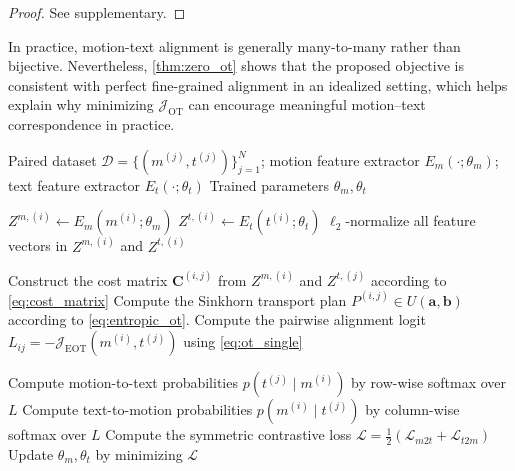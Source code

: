 \begin{proof} See supplementary.
\end{proof}

In practice, motion-text alignment is generally many-to-many rather than bijective. Nevertheless, \cref{thm:zero_ot} shows that the proposed objective is consistent with perfect fine-grained alignment in an idealized setting, which helps explain why minimizing $\mathcal{J}_{\mathrm{OT}}$ can encourage meaningful motion--text correspondence in practice.

\begin{algorithm}
\caption{CLIP-style Motion--Text Training with Sinkhorn-based Alignment}
\label{alg:ot_motion_text}
\begin{algorithmic}[1]
\REQUIRE Paired dataset $\mathcal{D}=\{(m^{(j)},t^{(j)})\}_{j=1}^N$;
motion feature extractor $E_m(\cdot;\theta_m)$; text feature extractor $E_t(\cdot;\theta_t)$
\ENSURE Trained parameters $\theta_m,\theta_t$

            \STATE $Z^{m,(i)} \leftarrow E_m(m^{(i)};\theta_m)$
            \STATE $Z^{t,(i)} \leftarrow E_t(t^{(i)};\theta_t)$
            \STATE $\ell_2$-normalize all feature vectors in $Z^{m,(i)}$ and $Z^{t,(i)}$
        \ENDFOR

                \STATE \textcolor{green!50!black}{Construct the cost matrix $\mathbf{C}^{(i,j)}$ from $Z^{m,(i)}$ and $Z^{t,(j)}$ according to \cref{eq:cost_matrix}}
                \STATE \textcolor{green!50!black}{Compute the Sinkhorn transport plan $P^{(i,j)} \in U(\mathbf{a},\mathbf{b})$ according to \cref{eq:entropic_ot}.} 
                \STATE \textcolor{green!50!black}{Compute the pairwise alignment logit $L_{ij} = -\mathcal{J}_{\mathrm{EOT}}(m^{(i)}, t^{(j)})$ using \cref{eq:ot_single}}
            \ENDFOR
        \ENDFOR

        \STATE Compute motion-to-text probabilities $p(t^{(j)}\mid m^{(i)})$ by row-wise softmax over $L$
        \STATE Compute text-to-motion probabilities $p(m^{(i)}\mid t^{(j)})$ by column-wise softmax over $L$
        \STATE Compute the symmetric contrastive loss $\mathcal{L}=\frac{1}{2}(\mathcal{L}_{m2t}+\mathcal{L}_{t2m})$
        \STATE Update $\theta_m,\theta_t$ by minimizing $\mathcal{L}$
    \ENDFOR
\ENDFOR
\end{algorithmic}
\end{algorithm}

